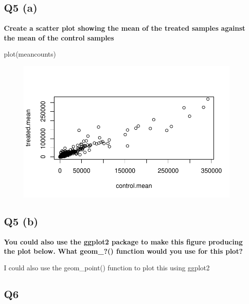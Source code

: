 \documentclass[
  letterpaper,
  DIV=11,
  numbers=noendperiod]{scrartcl}
\newenvironment{Shaded}{\begin{snugshade}}{\end{snugshade}}
\newcommand{\FunctionTok}[1]{\textcolor[rgb]{0.28,0.35,0.67}{#1}}
\newcommand{\NormalTok}[1]{\textcolor[rgb]{0.00,0.23,0.31}{#1}}
\begin{document}
\hypertarget{q5-a}{%
\subsection{\texorpdfstring{\textbf{Q5 (a)}}{Q5 (a)}}\label{q5-a}}

\textbf{Create a scatter plot showing the mean of the treated samples
against the mean of the control samples}

\begin{Shaded}
\begin{Highlighting}[]
\FunctionTok{plot}\NormalTok{(meancounts)}
\end{Highlighting}
\end{Shaded}

\begin{figure}[H]

{\centering \includegraphics{Class12_files/figure-pdf/unnamed-chunk-10-1.pdf}

}

\end{figure}

\hypertarget{q5-b}{%
\subsection{\texorpdfstring{\textbf{Q5 (b)}}{Q5 (b)}}\label{q5-b}}

\textbf{You could also use the ggplot2 package to make this figure
producing the plot below. What geom\_?() function would you use for this
plot?}

I could also use the geom\_point() function to plot this using ggplot2

\hypertarget{q6}{%
\subsection{\texorpdfstring{\textbf{Q6}}{Q6}}\label{q6}}
\end{document}
